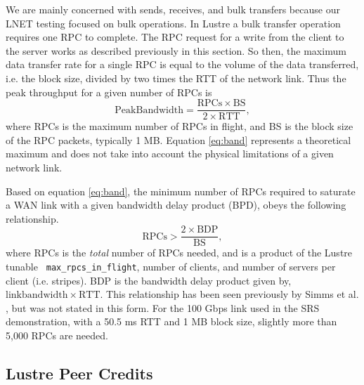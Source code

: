 \documentclass[]{sigplan-proc}
\begin{document}
We are mainly concerned with sends, receives, and bulk transfers because our LNET testing focused on bulk
operations. In Lustre a bulk transfer operation requires one RPC to complete. The RPC request for a write
from the client to the server works as described previously in this section. So then, the maximum data
transfer rate for a single RPC is equal to the volume of the data transferred, i.e. the block size, divided by
two times the RTT of the network link. Thus the peak throughput for a given number of RPCs is
\begin{equation}
\mathrm{Peak Bandwidth = \frac{RPCs \times BS}{2 \times RTT}},
\label{eq:band}
\end{equation}
where RPCs is the maximum number of RPCs in flight, and BS is the block size of the RPC packets, typically 1
MB. Equation \ref{eq:band} represents a theoretical maximum and does not take into account the physical
limitations of a given network link.

Based on equation \ref{eq:band}, the minimum number of RPCs required to saturate a WAN link with a given
bandwidth delay product (BPD), obeys the following relationship.
\begin{equation}
\mathrm{RPCs > \frac{2\times BDP}{BS},}
\label{eq:rpcs}
\end{equation}
where RPCs is the {\it total} number of RPCs needed, and is a product of the Lustre tunable {\tt
  max\_rpcs\_in\_flight}, number of clients, and number of servers per client (i.e. stripes). BDP is the
bandwidth delay product given by, $\mathrm{link bandwidth \times RTT}$. This relationship has been seen
previously by Simms et al. \cite{simms2007}, but was not stated in this form. For the 100 Gbps link used in
the SRS demonstration, with a 50.5 ms RTT and 1 MB block size, slightly more than 5,000 RPCs are needed.

\subsection{Lustre Peer Credits}
\end{document}
